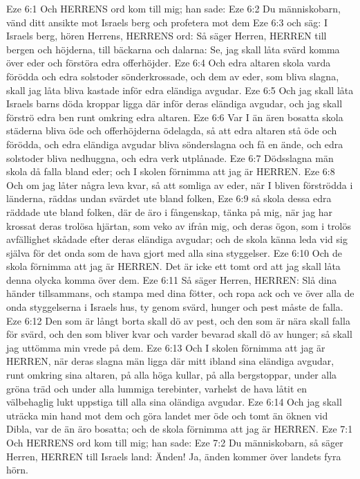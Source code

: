 Eze 6:1  Och HERRENS ord kom till mig; han sade:
Eze 6:2  Du människobarn, vänd ditt ansikte mot Israels berg och profetera mot dem
Eze 6:3  och säg: I Israels berg, hören Herrens, HERRENS ord: Så säger Herren, HERREN till bergen och höjderna, till bäckarna och dalarna: Se, jag skall låta svärd komma över eder och förstöra edra offerhöjder.
Eze 6:4  Och edra altaren skola varda förödda och edra solstoder sönderkrossade, och dem av eder, som bliva slagna, skall jag låta bliva kastade inför edra eländiga avgudar.
Eze 6:5  Och jag skall låta Israels barns döda kroppar ligga där inför deras eländiga avgudar, och jag skall förströ edra ben runt omkring edra altaren.
Eze 6:6  Var I än ären bosatta skola städerna bliva öde och offerhöjderna ödelagda, så att edra altaren stå öde och förödda, och edra eländiga avgudar bliva sönderslagna och få en ände, och edra solstoder bliva nedhuggna, och edra verk utplånade.
Eze 6:7  Dödsslagna män skola då falla bland eder; och I skolen förnimma att jag är HERREN.
Eze 6:8  Och om jag låter några leva kvar, så att somliga av eder, när I bliven förströdda i länderna, räddas undan svärdet ute bland folken,
Eze 6:9  så skola dessa edra räddade ute bland folken, där de äro i fångenskap, tänka på mig, när jag har krossat deras trolösa hjärtan, som veko av ifrån mig, och deras ögon, som i trolös avfällighet skådade efter deras eländiga avgudar; och de skola känna leda vid sig själva för det onda som de hava gjort med alla sina styggelser.
Eze 6:10  Och de skola förnimma att jag är HERREN. Det är icke ett tomt ord att jag skall låta denna olycka komma över dem.
Eze 6:11  Så säger Herren, HERREN: Slå dina händer tillsammans, och stampa med dina fötter, och ropa ack och ve över alla de onda styggelserna i Israels hus, ty genom svärd, hunger och pest måste de falla.
Eze 6:12  Den som är långt borta skall dö av pest, och den som är nära skall falla för svärd, och den som bliver kvar och varder bevarad skall dö av hunger; så skall jag uttömma min vrede på dem.
Eze 6:13  Och I skolen förnimma att jag är HERREN, när deras slagna män ligga där mitt ibland sina eländiga avgudar, runt omkring sina altaren, på alla höga kullar, på alla bergstoppar, under alla gröna träd och under alla lummiga terebinter, varhelst de hava låtit en välbehaglig lukt uppstiga till alla sina oländiga avgudar.
Eze 6:14  Och jag skall uträcka min hand mot dem och göra landet mer öde och tomt än öknen vid Dibla, var de än äro bosatta; och de skola förnimma att jag är HERREN.
Eze 7:1  Och HERRENS ord kom till mig; han sade:
Eze 7:2  Du människobarn, så säger Herren, HERREN till Israels land: Änden! Ja, änden kommer över landets fyra hörn.
